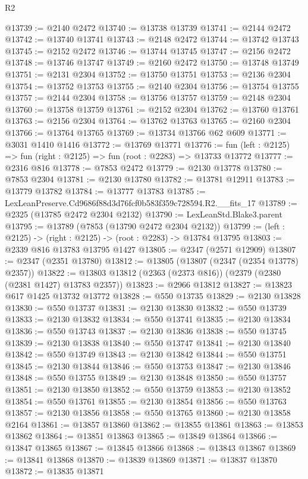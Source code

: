 \begin{lexlean}{R2}
\begin{coremodule}
@13739 := @2140 @2472
@13740 := @13738 @13739
@13741 := @2144 @2472
@13742 := @13740 @13741
@13743 := @2148 @2472
@13744 := @13742 @13743
@13745 := @2152 @2472
@13746 := @13744 @13745
@13747 := @2156 @2472
@13748 := @13746 @13747
@13749 := @2160 @2472
@13750 := @13748 @13749
@13751 := @2131 @2304
@13752 := @13750 @13751
@13753 := @2136 @2304
@13754 := @13752 @13753
@13755 := @2140 @2304
@13756 := @13754 @13755
@13757 := @2144 @2304
@13758 := @13756 @13757
@13759 := @2148 @2304
@13760 := @13758 @13759
@13761 := @2152 @2304
@13762 := @13760 @13761
@13763 := @2156 @2304
@13764 := @13762 @13763
@13765 := @2160 @2304
@13766 := @13764 @13765
@13769 := @13734 @13766 @62 @609
@13771 := @3031 @1410 @1416
@13772 := @13769 @13771
@13776 := fun (left : @2125) => fun (right : @2125) => fun (root : @2283) => @13733 @13772
@13777 := @2316 @816
@13778 := @7853 @2472
@13779 := @2130 @13778
@13780 := @7853 @2304
@13781 := @2130 @13780
@13782 := @13781 @12911
@13783 := @13779 @13782
@13784 := @13777 @13783
@13785 := LexLeanPreserve.Cd9686f88d3d76fcf0b583f359c728594.R2.__fits_17
@13789 := @2325 (@13785 @2472 @2304 @2132)
@13790 := LexLeanStd.Blake3.parent
@13795 := @13789 (@7853 (@13790 @2472 @2304 @2132))
@13799 := (left : @2125) -> (right : @2125) -> (root : @2283) -> @13784 @13795
@13803 := @2339 @816 @13783 @13795 @1427
@13805 := @2347 (@2571 @12909)
@13807 := @2347 (@2351 @13780)
@13812 := @13805 (@13807 (@2347 (@2354 @13778) @2357))
@13822 := @13803 @13812 (@2363 (@2373 @816)) (@2379 (@2380 (@2381 @1427) @13783 @2357))
@13823 := @2966 @13812
@13827 := @13823 @617 @1425 @13732 @13772
@13828 := @550 @13735
@13829 := @2130 @13828
@13830 := @550 @13737
@13831 := @2130 @13830
@13832 := @550 @13739
@13833 := @2130 @13832
@13834 := @550 @13741
@13835 := @2130 @13834
@13836 := @550 @13743
@13837 := @2130 @13836
@13838 := @550 @13745
@13839 := @2130 @13838
@13840 := @550 @13747
@13841 := @2130 @13840
@13842 := @550 @13749
@13843 := @2130 @13842
@13844 := @550 @13751
@13845 := @2130 @13844
@13846 := @550 @13753
@13847 := @2130 @13846
@13848 := @550 @13755
@13849 := @2130 @13848
@13850 := @550 @13757
@13851 := @2130 @13850
@13852 := @550 @13759
@13853 := @2130 @13852
@13854 := @550 @13761
@13855 := @2130 @13854
@13856 := @550 @13763
@13857 := @2130 @13856
@13858 := @550 @13765
@13860 := @2130 @13858 @2164
@13861 := @13857 @13860
@13862 := @13855 @13861
@13863 := @13853 @13862
@13864 := @13851 @13863
@13865 := @13849 @13864
@13866 := @13847 @13865
@13867 := @13845 @13866
@13868 := @13843 @13867
@13869 := @13841 @13868
@13870 := @13839 @13869
@13871 := @13837 @13870
@13872 := @13835 @13871

\end{coremodule}
\end{lexlean}
